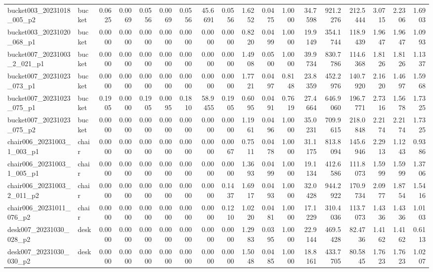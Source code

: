 \begin{table}[t]
{\begin{tabular}{l l r r r r r r r r r r r r r r r r }
bucket003\_20231018\_005\_p2 & bucket & 0.0625 & 0.0069 & 0.0556 & 0.0069 & 0.0556 & 45.6691 & 0.0556 & 1.6252 & 0.0475 & 1.0000 & 34.7598 & 921.2276 & 212.5444 & 3.0715 & 2.2306 & 1.6903 \\
bucket003\_20231020\_068\_p1 & bucket & 0.0000 & 0.0000 & 0.0000 & 0.0000 & 0.0000 & 0.0000 & 0.0000 & 0.8220 & 0.0499 & 1.0000 & 19.9149 & 354.1744 & 118.9439 & 1.9647 & 1.9647 & 1.0993 \\
bucket007\_20231003\_2\_021\_p1 & bucket & 0.0000 & 0.0000 & 0.0000 & 0.0000 & 0.0000 & 0.0000 & 0.0000 & 1.4908 & 0.0500 & 1.0000 & 39.9734 & 830.7786 & 114.6368 & 1.8126 & 1.8126 & 1.1337 \\
bucket007\_20231023\_073\_p1 & bucket & 0.0000 & 0.0000 & 0.0000 & 0.0000 & 0.0000 & 0.0000 & 0.0000 & 1.7721 & 0.0497 & 0.8148 & 23.8359 & 452.2976 & 140.7920 & 2.1620 & 1.4697 & 1.5968 \\
bucket007\_20231023\_075\_p1 & bucket & 0.1905 & 0.0000 & 0.1905 & 0.0095 & 0.1810 & 58.9455 & 0.1905 & 0.6095 & 0.0491 & 0.7619 & 27.4664 & 646.9060 & 196.7771 & 2.7316 & 1.5678 & 1.7325 \\
bucket007\_20231023\_075\_p2 & bucket & 0.0000 & 0.0000 & 0.0000 & 0.0000 & 0.0000 & 0.0000 & 0.0000 & 1.1961 & 0.0496 & 1.0000 & 35.0231 & 709.9615 & 218.0848 & 2.2174 & 2.2174 & 1.7325 \\
chair006\_20231003\_1\_003\_p1 & chair & 0.0000 & 0.0000 & 0.0000 & 0.0000 & 0.0000 & 0.0000 & 0.0067 & 0.7511 & 0.0478 & 1.0000 & 31.1175 & 813.8094 & 145.6946 & 2.2913 & 1.1243 & 0.9386 \\
chair006\_20231003\_1\_005\_p1 & chair & 0.0000 & 0.0000 & 0.0000 & 0.0000 & 0.0000 & 0.0000 & 0.0000 & 1.3693 & 0.0499 & 1.0000 & 19.1134 & 412.6586 & 111.8073 & 1.5999 & 1.5999 & 1.3706 \\
chair006\_20231003\_2\_011\_p2 & chair & 0.0000 & 0.0000 & 0.0000 & 0.0000 & 0.0000 & 0.0000 & 0.1437 & 1.6917 & 0.0493 & 1.0000 & 32.0428 & 944.2922 & 170.9734 & 2.0977 & 1.8754 & 1.5416 \\
chair006\_20231011\_076\_p2 & chair & 0.0000 & 0.0000 & 0.0000 & 0.0000 & 0.0000 & 0.0000 & 0.1210 & 1.0220 & 0.0481 & 1.0000 & 17.1229 & 310.4036 & 113.7073 & 1.4336 & 1.4336 & 1.0103 \\
desk007\_20231030\_028\_p2 & desk & 0.0000 & 0.0000 & 0.0000 & 0.0000 & 0.0000 & 0.0000 & 0.0000 & 1.2983 & 0.0395 & 1.0000 & 22.9144 & 469.5428 & 82.4736 & 1.4162 & 1.4162 & 0.6113 \\
desk007\_20231030\_030\_p2 & desk & 0.0000 & 0.0000 & 0.0000 & 0.0000 & 0.0000 & 0.0000 & 0.0000 & 1.5048 & 0.0485 & 1.0000 & 18.8161 & 433.7705 & 80.5845 & 1.7623 & 1.7623 & 1.0207 \\

\end{tabular}}
\end{table}
